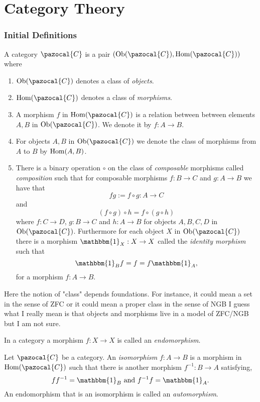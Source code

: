 \section{Category Theory}
\subsubsection{Initial Definitions}
\begin{definition}
    A category $\pazocal{C}$ is a pair $(\Ob(\pazocal{C}),\Hom(\pazocal{C}))$ where 
    \begin{enumerate} 
    \item $\Ob(\pazocal{C})$ denotes a class of \textit{objects}. \item $\Hom(\pazocal{C})$ denotes a class of \textit{morphisms}. 
    \item A morphism $f$ in $\Hom(\pazocal{C})$ is a relation between between elements $A,B$ in $\Ob(\pazocal{C})$. We denote it by $f : A \rightarrow B$. 
    \item For objects $A,B$ in $\Ob(\pazocal{C})$ we denote the class of morphisms from $A$ to $B$ by $\mathrm{Hom}(A,B)$.
    \item There is a binary operation $\circ$ on the class of \emph{composable} morphisms called \textit{composition} such that for composable morphisms $f: B\rightarrow C$ and $g : A \rightarrow B$ we have that
    $$fg := f\circ g : A \rightarrow C$$
    and 
    $$(f\circ g)\circ h = f\circ(g\circ h)$$
    where $f : C \rightarrow D$, $g: B \rightarrow C$ and $h: A \rightarrow B$ for objects $A,B,C,D$ in $\Ob(\pazocal{C})$. Furthermore for each object $X$ in $\Ob(\pazocal{C})$ there is a morphism $\mathbbm{1}_X : X \rightarrow X$ called the \textit{identity morphism} such that 
    $$\mathbbm{1}_B f = f = f \mathbbm{1}_A,$$
    for a morphism $f: A \rightarrow B$.
    \end{enumerate}
\end{definition}
\begin{remark}
    Here the notion of "class" depends foundations. For instance, it could mean a set in the sense of ZFC or it could mean a proper class in the sense of NGB {\Large I guess what I really mean is that objects and morphisms live in a model of ZFC/NGB but I am not sure}. 
\end{remark}
\begin{definition}
    In a category a morphism $f : X\rightarrow X$ is called an \emph{endomorphism}.
\end{definition}
\begin{definition}
    Let $\pazocal{C}$ be a category. An \textit{isomorphism} $f:A \rightarrow B$ is a morphism in $\Hom(\pazocal{C})$ such that there is another morphism $f^{-1} : B\rightarrow A$ satisfying,
    $$ff^{-1} = \mathbbm{1}_B \ \mathrm{ and } \ f^{-1}f = \mathbbm{1}_A.$$
    An endomorphism that is an isomorphism is called an \emph{automorphism}. 
\end{definition}


